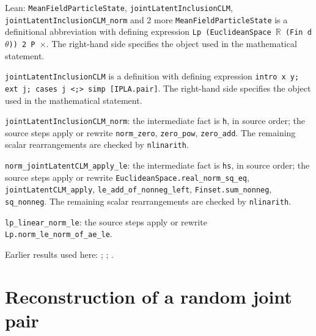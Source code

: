 \documentclass[11pt,a4paper]{article}
\begin{document}
\begin{leanbox}{Lean: \texttt{MeanFieldParticleState}, \texttt{jointLatentInclusionCLM}, \texttt{jointLatentInclusionCLM\_\allowbreak{}norm} and 2 more}
\texttt{Mean\allowbreak{}Field\allowbreak{}Particle\allowbreak{}State} is a definitional abbreviation with defining expression \texttt{Lp (Euclidean\allowbreak{}Space \ensuremath{\mathbb R} (Fin d\ensuremath{\theta})) 2 P \ensuremath{\times}}. The right-hand side specifies the object used in the mathematical statement.



\texttt{joint\allowbreak{}Latent\allowbreak{}Inclusion\allowbreak{}CLM} is a definition with defining expression \texttt{intro x y; ext j; cases j <;> simp [IPLA.\allowbreak{}pair]}. The right-hand side specifies the object used in the mathematical statement.



\texttt{joint\allowbreak{}Latent\allowbreak{}Inclusion\allowbreak{}CLM\_\allowbreak{}norm}: the intermediate fact is \texttt{h}, in source order; the source steps apply or rewrite \texttt{norm\_\allowbreak{}zero}, \texttt{zero\_\allowbreak{}pow}, \texttt{zero\_\allowbreak{}add}. The remaining scalar rearrangements are checked by \texttt{nlinarith}.



\texttt{norm\_\allowbreak{}joint\allowbreak{}Latent\allowbreak{}CLM\_\allowbreak{}apply\_\allowbreak{}le}: the intermediate fact is \texttt{hs}, in source order; the source steps apply or rewrite \texttt{Euclidean\allowbreak{}Space.\allowbreak{}real\_\allowbreak{}norm\_\allowbreak{}sq\_\allowbreak{}eq}, \texttt{joint\allowbreak{}Latent\allowbreak{}CLM\_\allowbreak{}apply}, \texttt{le\_\allowbreak{}add\_\allowbreak{}of\_\allowbreak{}nonneg\_\allowbreak{}left}, \texttt{Finset.\allowbreak{}sum\_\allowbreak{}nonneg}, \texttt{sq\_\allowbreak{}nonneg}. The remaining scalar rearrangements are checked by \texttt{nlinarith}.



\texttt{lp\_\allowbreak{}linear\_\allowbreak{}norm\_\allowbreak{}le}: the source steps apply or rewrite \texttt{Lp.\allowbreak{}norm\_\allowbreak{}le\_\allowbreak{}norm\_\allowbreak{}of\_\allowbreak{}ae\_\allowbreak{}le}.
\end{leanbox}


Earlier results used here: \cite[Section~3.1.1]{LangevinLean2026IPLA}; \cite[Section~3.3.1]{LangevinLean2026IPLA}; \cite[Section~3.9.1]{LangevinLean2026IPLA}.

\section{\texorpdfstring{Reconstruction of a random joint pair}{Reconstruction of a random joint pair}}
\end{document}
